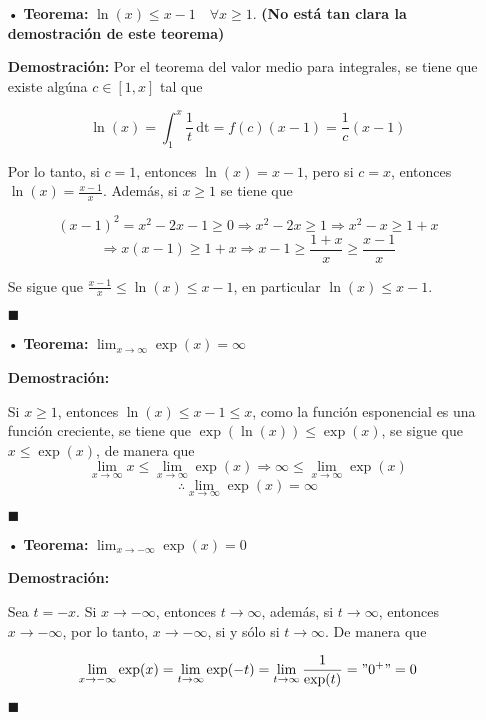 \documentclass[pts12]{article}
\numberwithin{equation}{section}
\newcommand{\Col}{\color{ProcessBlue}}
\newcommand{\xinteg}[4]{\int_{#1}^{#2} \! {#3} \, \mathrm{#4}}
\begin{document}
\begin{itemize}
\item[\Col •] \textbf{Teorema:} $\ln(x)\leq x-1 \quad \forall x\geq 1$. \textbf{(No está tan clara la demostración de este teorema)}

\textbf{Demostración:} Por el teorema del valor medio para integrales, se tiene que existe algúna $c\in [1,x]$ tal que

$$ \ln(x)=\xinteg{1}{x}{\frac{1}{t}}{dt}=f(c)(x-1)=\frac{1}{c}(x-1) $$

Por lo tanto, si $c=1$, entonces $\ln(x)=x-1$, pero si $c=x$, entonces $\ln(x)=\frac{x-1}{x}$. Además, si $x\geq 1$ se tiene que 

$$ (x-1)^2=x^2-2x-1\geq 0 \Rightarrow x^2-2x\geq 1 \Rightarrow x^2-x\geq 1+x $$
$$ \Rightarrow x(x-1)\geq 1+x \Rightarrow x-1\geq \frac{1+x}{x} \geq \frac{x-1}{x} $$

Se sigue que $\frac{x-1}{x}\leq\ln(x)\leq x-1$, en particular $\ln(x)\leq x-1$.

\begin{flushright}
$\blacksquare$
\end{flushright} 

\item[\Col •] \textbf{Teorema:} $\lim_{x\to \infty}\exp(x)=\infty$

\textbf{Demostración:}

Si $x\geq 1$, entonces $\ln(x)\leq x-1\leq x$, como la función esponencial es una función creciente, se tiene que $\exp(\ln(x))\leq\exp(x)$, se sigue que $x\leq\exp(x)$, de manera que
$$ \lim_{x\to\infty}x\leq\lim_{x\to\infty}\exp(x)\Rightarrow \infty\leq\lim_{x\to\infty}\exp(x) $$
$$ \therefore \lim_{x\to\infty}\exp(x)=\infty $$

\begin{flushright}
$\blacksquare$
\end{flushright} 

\item[\Col •] \textbf{Teorema:} $\lim_{x\to -\infty}\exp(x)=0$

\textbf{Demostración:} 

Sea $t=-x$. Si $x\to -\infty$, entonces $t\to\infty$, además, si $t\to\infty$, entonces $x\to-\infty$, por lo tanto, $x\to -\infty$, si y sólo si $t\to\infty$. De manera que

$$\lim_{x\to -\infty}\exp(x)=\lim_{t\to\infty}\exp(-t)=\lim_{t\to\infty}\frac{1}{\exp(t)}="0^+"=0$$

\begin{flushright}
$\blacksquare$
\end{flushright} 


\end{itemize}
\end{document}
